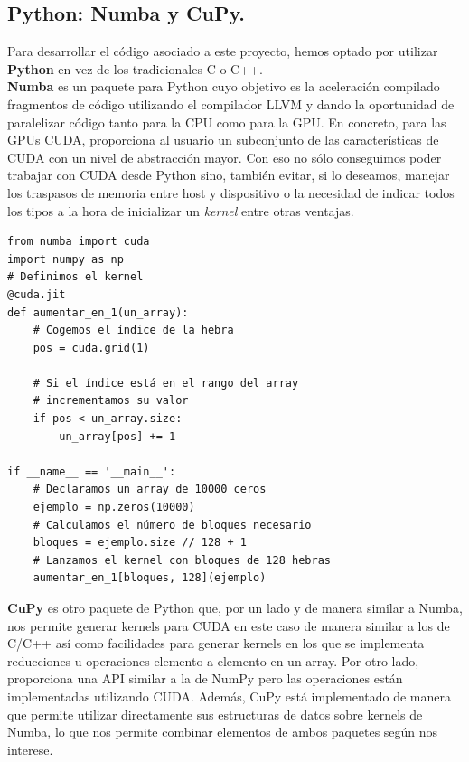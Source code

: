 \subsection{Python: Numba y CuPy.}
Para desarrollar el código asociado a este proyecto, hemos optado por utilizar \textbf{Python} en vez de los tradicionales C o C++. \\

\textbf{Numba} \cite{numba} es un paquete para Python cuyo objetivo es la aceleración compilado fragmentos de código utilizando el compilador LLVM y dando la oportunidad de paralelizar código tanto para la CPU como para la GPU. En concreto, para las GPUs CUDA, proporciona al usuario un subconjunto de las características de CUDA con un nivel de abstracción mayor. Con eso no sólo conseguimos poder trabajar con CUDA desde Python sino, también evitar, si lo deseamos, manejar los traspasos de memoria entre host y dispositivo o la necesidad de indicar todos los tipos a la hora de inicializar un \textit{kernel} entre otras ventajas.
\begin{code}
\begin{verbatim}
from numba import cuda
import numpy as np
# Definimos el kernel
@cuda.jit
def aumentar_en_1(un_array):
	# Cogemos el índice de la hebra
    pos = cuda.grid(1)

    # Si el índice está en el rango del array
    # incrementamos su valor
    if pos < un_array.size:
        un_array[pos] += 1

if __name__ == '__main__':
	# Declaramos un array de 10000 ceros
	ejemplo = np.zeros(10000)
	# Calculamos el número de bloques necesario
	bloques = ejemplo.size // 128 + 1
	# Lanzamos el kernel con bloques de 128 hebras
	aumentar_en_1[bloques, 128](ejemplo)
\end{verbatim}
\label{code:numbaexample}
\end{code}

\textbf{CuPy} \cite{cupy} es otro paquete de Python que, por un lado y de manera similar a Numba, nos permite generar kernels para CUDA en este caso de manera similar a los de C/C++ así como facilidades para generar kernels en los que se implementa reducciones u operaciones elemento a elemento en un array. Por otro lado, proporciona una API similar a la de NumPy pero las operaciones están implementadas utilizando CUDA. Además, CuPy está implementado de manera que permite utilizar directamente sus estructuras de datos sobre kernels de Numba, lo que nos permite combinar elementos de ambos paquetes según nos interese.


